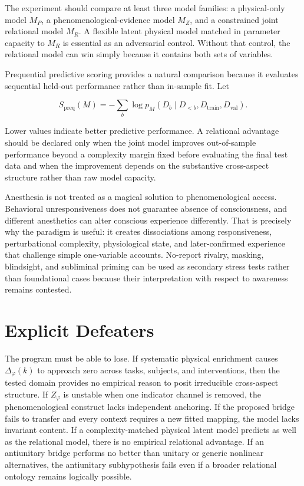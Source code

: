 The experiment should compare at least three model families: a physical-only model $M_P$, a phenomenological-evidence model $M_Z$, and a constrained joint relational model $M_R$. A flexible latent physical model matched in parameter capacity to $M_R$ is essential as an adversarial control. Without that control, the relational model can win simply because it contains both sets of variables.

Prequential predictive scoring provides a natural comparison because it evaluates sequential held-out performance rather than in-sample fit. Let

\[
S_{\mathrm{preq}}(M)=-\sum_b\log p_M(D_b\mid D_{<b},D_{\mathrm{train}},D_{\mathrm{val}}).
\]

Lower values indicate better predictive performance. A relational advantage should be declared only when the joint model improves out-of-sample performance beyond a complexity margin fixed before evaluating the final test data and when the improvement depends on the substantive cross-aspect structure rather than raw model capacity.

Anesthesia is not treated as a magical solution to phenomenological access. Behavioral unresponsiveness does not guarantee absence of consciousness, and different anesthetics can alter conscious experience differently. That is precisely why the paradigm is useful: it creates dissociations among responsiveness, perturbational complexity, physiological state, and later-confirmed experience that challenge simple one-variable accounts. No-report rivalry, masking, blindsight, and subliminal priming can be used as secondary stress tests rather than foundational cases because their interpretation with respect to awareness remains contested.

\section{Explicit Defeaters}

The program must be able to lose. If systematic physical enrichment causes $\Delta_\varphi(k)$ to approach zero across tasks, subjects, and interventions, then the tested domain provides no empirical reason to posit irreducible cross-aspect structure. If $Z_\varphi$ is unstable when one indicator channel is removed, the phenomenological construct lacks independent anchoring. If the proposed bridge fails to transfer and every context requires a new fitted mapping, the model lacks invariant content. If a complexity-matched physical latent model predicts as well as the relational model, there is no empirical relational advantage. If an antiunitary bridge performs no better than unitary or generic nonlinear alternatives, the antiunitary subhypothesis fails even if a broader relational ontology remains logically possible.

